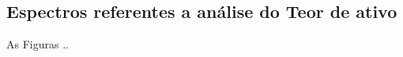 %
%

\begin{apendicesenv}

\chapter{Espectros referentes a análise do Teor de ativo}
\label{chap:apendicey}

As Figuras ..

\end{apendicesenv}